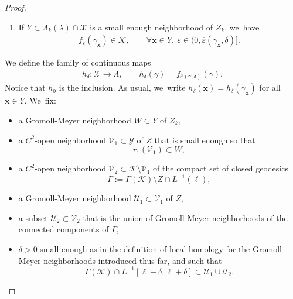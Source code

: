 \documentclass[11pt]{article}
\let\epsilon\varepsilon
\let\bm\boldsymbol
\newcommand{\KK}{\mathcal{K}}
\newcommand{\UU}{\mathcal{U}}
\newcommand{\VV}{\mathcal{V}}
\newcommand{\XX}{\mathcal{X}}
\newcommand{\YY}{\mathcal{Y}}
\newcommand{\xx}{\bm{x}}
\theoremstyle{plain}
\theoremstyle{definition}
\begin{document}
\begin{proof}
\begin{enumerate}
\item\label{l:finitely_generatediii}
If $Y\subset\Lambda_k(\lambda)\cap\XX$ is a small enough neighborhood of $Z_k$, we~have
\begin{align*}
f_\epsilon(\gamma_{\xx})\in\KK,\qquad\forall\xx\in Y,\ \epsilon\in(0,\overline\epsilon(\gamma_{\xx},\delta)].
\end{align*}
\end{enumerate}
We define the family of continuous maps
\begin{align*}
h_\delta:\XX\to\Lambda,
\qquad h_\delta(\gamma)=f_{\overline\epsilon(\gamma,\delta)}(\gamma).
\end{align*}
Notice that $h_0$ is the inclusion.
As usual, we~write $h_\delta(\xx)=h_\delta(\gamma_{\xx})$ for all $\xx\in Y$. We~fix:
\begin{itemize}
\item a Gromoll-Meyer neighborhood $W\subset Y$ of $Z_k$,

\item a $C^2$-open neighborhood $\VV_1\subset\YY$ of $Z$ that is small enough so that
\[
r_1(\VV_1)\subset W,
\]

\item a $C^2$-open neighborhood $\VV_2\subset\KK\setminus\VV_1$ of the compact set of closed geodesics
\[
\Gamma:=\Gamma(\KK)\setminus Z\cap L^{-1}(\ell),
\]

\item a Gromoll-Meyer neighborhood $\UU_1\subset\VV_1$ of $Z$,

\item a subset $\UU_2\subset\VV_2$ that is the union of Gromoll-Meyer neighborhoods of the connected components of $\Gamma$,

\item $\delta>0$ small enough as in the definition of local homology for the Gromoll-Meyer neighborhoods introduced thus far, and such that
\[
\Gamma(\KK)\cap L^{-1}[\ell-\delta,\ell+\delta]\subset\UU_1\cup\UU_2.
\]
\end{itemize}


\end{proof}
\end{document}
